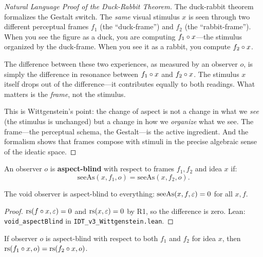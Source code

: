 \begin{proof}[Natural Language Proof of the Duck-Rabbit Theorem]
The duck-rabbit theorem formalizes the Gestalt switch. The \emph{same} visual
stimulus $x$ is seen through two different perceptual frames $f_1$ (the
``duck-frame'') and $f_2$ (the ``rabbit-frame''). When you see the figure
as a duck, you are computing $f_1 \circ x$---the stimulus organized by
the duck-frame. When you see it as a rabbit, you compute $f_2 \circ x$.

The difference between these two experiences, as measured by an observer $o$,
is simply the difference in resonance between $f_1 \circ x$ and
$f_2 \circ x$. The stimulus $x$ itself drops out of the difference---it
contributes equally to both readings. What matters is the \emph{frame}, not
the stimulus.

This is Wittgenstein's point: the change of aspect is not a change in what
we \emph{see} (the stimulus is unchanged) but a change in how we \emph{organize}
what we see. The frame---the perceptual schema, the Gestalt---is the active
ingredient. And the formalism shows that frames compose with stimuli in the
precise algebraic sense of the ideatic space.
\end{proof}

\begin{definition}
\label{def:aspect-blind}
An observer $o$ is \textbf{aspect-blind} with respect to frames $f_1, f_2$
and idea $x$ if:
\[
\mathrm{seeAs}(x, f_1, o) = \mathrm{seeAs}(x, f_2, o).
\]
\end{definition}

\begin{theorem}
\label{thm:void-aspectblind}
The void observer is aspect-blind to everything:
$\mathrm{seeAs}(x, f, \varepsilon) = 0$ for all $x, f$.
\end{theorem}

\begin{proof}
$\mathrm{rs}(f \circ x, \varepsilon) = 0$ and $\mathrm{rs}(x, \varepsilon) = 0$ by R1, so the
difference is zero.
Lean: \texttt{void\_aspectBlind} in \texttt{IDT\_v3\_Wittgenstein.lean}.
\end{proof}

\begin{theorem}
\label{thm:both-blind}
If observer $o$ is aspect-blind with respect to both $f_1$ and $f_2$
for idea $x$, then $\mathrm{rs}(f_1 \circ x, o) = \mathrm{rs}(f_2 \circ x, o)$.
\end{theorem}

